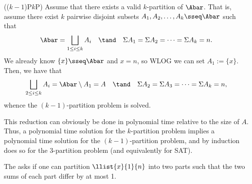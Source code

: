 \documentclass{article}
\begin{document}
\begin{solution}
\begin{subproof}[Correctness.]
    ((\( k-1 \))P\pmi \( k \)P)
    Assume that there exists a valid \( k \)-partition of \( \Abar \).
    That is, assume there exist \( k \) pairwise disjoint subsets \( A_1, A_2, \ldots, A_k \sseq \Abar \) such that \begin{align*}
      \Abar = \bigsqcup_{1\leq i \leq k}A_{i} \quad \tand \quad \Sigma A_1 = \Sigma A_2 = \cdots = \Sigma A_{k} = n.
    \end{align*}
    We already know \( \{x\}\sseq \Abar \) and \( x=n \), so WLOG we can set \( A_1 := \{x\} \).
    Then, we have that \begin{align*}
      \bigsqcup_{2\leq i \leq k}A_{i} = \Abar \setminus A_1 = A \quad \tand \quad \Sigma A_2 = \Sigma A_3 = \cdots = \Sigma A_{k} = n,
    \end{align*}
    whence the \( (k-1) \)-partition problem is solved.
  \end{subproof}
  This reduction can obviously be done in polynomial time relative to the size of \( A \).
  Thus, a polynomial time solution for the \( k \)-partition problem implies a polynomial time solution for the \( (k-1) \)-partition problem, and by induction does so for the 3-partition problem (and equivalently for SAT).
\end{solution}
\pagebreak


\begin{subexercise}
  The  asks if one can partition \( \llist{x}{1}{n} \) into two parts such that the two sums of each part differ by at most 1.
\end{subexercise}
\end{document}
